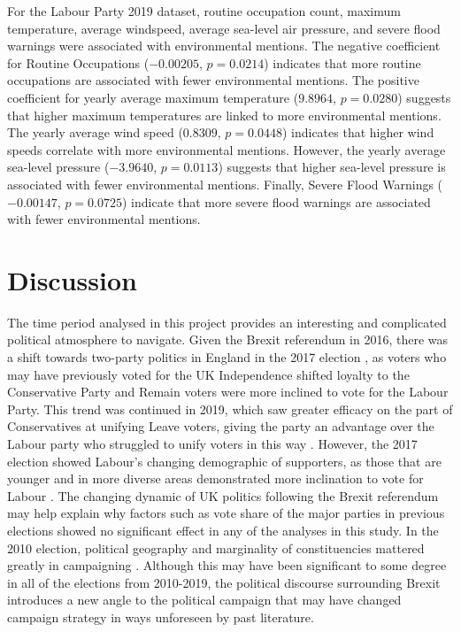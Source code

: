 \documentclass[12pt,letterpaper]{article}
\begin{document}
For the Labour Party 2019 dataset, routine occupation count, maximum temperature, average windspeed, average sea-level air pressure, and severe flood warnings were associated with environmental mentions. The negative coefficient for Routine Occupations (\(-0.00205\), \(p = 0.0214\)) indicates that more routine occupations are associated with fewer environmental mentions. The positive coefficient for yearly average maximum temperature (\(9.8964\), \(p = 0.0280\)) suggests that higher maximum temperatures are linked to more environmental mentions. The yearly average wind speed (\(0.8309\), \(p = 0.0448\)) indicates that higher wind speeds correlate with more environmental mentions. However, the yearly average sea-level pressure (\(-3.9640\), \(p = 0.0113\)) suggests that higher sea-level pressure is associated with fewer environmental mentions. Finally, Severe Flood Warnings (\(-0.00147\), \(p = 0.0725\)) indicate that more severe flood warnings are associated with fewer environmental mentions.
	


\section{Discussion}


The time period analysed in this project provides an interesting and complicated political atmosphere to navigate. Given the Brexit referendum in 2016, there was a shift towards two-party politics in England in the 2017 election \autocite{hoboltBrexit2017UK2018,prosserStrangeDeathMultiparty2018}, as voters who may have previously voted for the UK Independence shifted loyalty to the Conservative Party and Remain voters were more inclined to vote for the Labour Party. This trend was continued in 2019, which saw greater efficacy on the part of Conservatives at unifying Leave voters, giving the party an advantage over the Labour party who struggled to unify voters in this way \autocite{cuttsBrexit2019General2020}. However, the 2017 election showed Labour's changing demographic of supporters, as those that are younger and in more diverse areas demonstrated more inclination to vote for Labour \autocite{heath2017GeneralElection2017}. The changing dynamic of UK politics following the Brexit referendum may help explain why factors such as vote share of the major parties in previous elections showed no significant effect in any of the analyses in this study. In the 2010 election, political geography and marginality of constituencies mattered greatly in campaigning \autocite{johnstonLearningElectoralGeography2013}. Although this may have been significant to some degree in all of the elections from 2010-2019, the political discourse surrounding Brexit introduces a new angle to the political campaign that may have changed campaign strategy in ways unforeseen by past literature.
\end{document}
